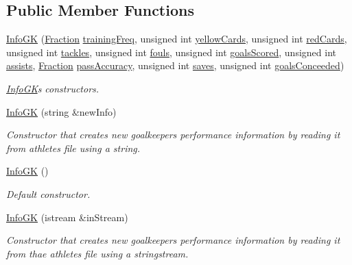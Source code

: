 \subsection*{Public Member Functions}
\begin{DoxyCompactItemize}
\item 
\hyperlink{class_info_g_k_ae71501a397ad142ce48e7136be6ebb06}{Info\+GK} (\hyperlink{class_fraction}{Fraction} \hyperlink{class_info_ae893be5aad319de5d911c3f80cc0a2d4}{training\+Freq}, unsigned int \hyperlink{class_info_aabdfdb282f3ceaae1772574bf2b3cd86}{yellow\+Cards}, unsigned int \hyperlink{class_info_a953c30accc7e6ff301542adfd5824f38}{red\+Cards}, unsigned int \hyperlink{class_info_aecdd57d96490b16a0c2590dd8f34009e}{tackles}, unsigned int \hyperlink{class_info_a2f90c84ba67c0e225dd58cdc14ab7f3d}{fouls}, unsigned int \hyperlink{class_info_a5ad5f72833856502b9c1f6ea50a98619}{goals\+Scored}, unsigned int \hyperlink{class_info_a1c0340af11df3407946b0ffdaae28864}{assists}, \hyperlink{class_fraction}{Fraction} \hyperlink{class_info_a37ee53dc8ae9a9656206e7eb389c6392}{pass\+Accuracy}, unsigned int \hyperlink{class_info_g_k_a0cd48fb9138effb26433639f12311794}{saves}, unsigned int \hyperlink{class_info_g_k_a1380b4f12dffe7a8cadd23e06e5c645f}{goals\+Conceeded})
\begin{DoxyCompactList}\small\item\em \hyperlink{class_info_g_k}{Info\+GK}\textquotesingle{}s constructors. \end{DoxyCompactList}\item 
\hyperlink{class_info_g_k_a3492995eb8a38acae93a8068a6be36ea}{Info\+GK} (string \&new\+Info)
\begin{DoxyCompactList}\small\item\em Constructor that creates new goalkeeper\textquotesingle{}s performance information by reading it from athletes file using a string. \end{DoxyCompactList}\item 
\hyperlink{class_info_g_k_a433a9a5bf75d9624be89100bc2e2e118}{Info\+GK} ()
\begin{DoxyCompactList}\small\item\em Default constructor. \end{DoxyCompactList}\item 
\hyperlink{class_info_g_k_aeace217be1619844c5637ba5cd3717ef}{Info\+GK} (istream \&in\+Stream)
\begin{DoxyCompactList}\small\item\em Constructor that creates new goalkeeper\textquotesingle{}s performance information by reading it from thae athletes file using a stringstream. \end{DoxyCompactList}\item 

\end{DoxyCompactItemize}
